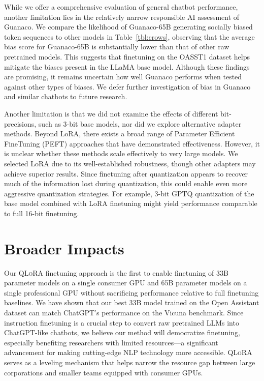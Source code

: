While we offer a comprehensive evaluation of general chatbot performance, another limitation lies in the relatively narrow responsible AI assessment of {Guanaco}. We compare the likelihood of {Guanaco}-65B generating socially biased token sequences to other models in Table~\ref{tbl:crows}, observing that the average bias score for {Guanaco}-65B is substantially lower than that of other raw pretrained models. This suggests that finetuning on the OASST1 dataset helps mitigate the biases present in the LLaMA base model. Although these findings are promising, it remains uncertain how well {Guanaco} performs when tested against other types of biases. We defer further investigation of bias in {Guanaco} and similar chatbots to future research.

Another limitation is that we did not examine the effects of different bit-precisions, such as 3-bit base models, nor did we explore alternative adapter methods. Beyond LoRA, there exists a broad range of Parameter Efficient FineTuning (PEFT) approaches that have demonstrated effectiveness. However, it is unclear whether these methods scale effectively to very large models. We selected LoRA due to its well-established robustness, though other adapters may achieve superior results. Since finetuning after quantization appears to recover much of the information lost during quantization, this could enable even more aggressive quantization strategies. For example, 3-bit GPTQ quantization of the base model combined with LoRA finetuning might yield performance comparable to full 16-bit finetuning.

\section{Broader Impacts}

Our \textsc{QLoRA} finetuning approach is the first to enable finetuning of 33B parameter models on a single consumer GPU and 65B parameter models on a single professional GPU without sacrificing performance relative to full finetuning baselines. We have shown that our best 33B model trained on the Open Assistant dataset can match ChatGPT’s performance on the Vicuna benchmark. Since instruction finetuning is a crucial step to convert raw pretrained LLMs into ChatGPT-like chatbots, we believe our method will democratize finetuning, especially benefiting researchers with limited resources—a significant advancement for making cutting-edge NLP technology more accessible. \textsc{QLoRA} serves as a leveling mechanism that helps narrow the resource gap between large corporations and smaller teams equipped with consumer GPUs.

